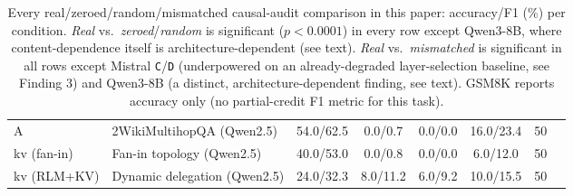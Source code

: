 \begin{table}[t]
\begin{tabular}{llcccccc}
A            & 2WikiMultihopQA (Qwen2.5)   & 54.0/62.5 & 0.0/0.7  & 0.0/0.0  & 16.0/23.4 & 50 \\
kv (fan-in)  & Fan-in topology (Qwen2.5)   & 40.0/53.0 & 0.0/0.8  & 0.0/0.0  & 6.0/12.0  & 50 \\
kv (RLM+KV)  & Dynamic delegation (Qwen2.5)& 24.0/32.3 & 8.0/11.2 & 6.0/9.2  & 10.0/15.5 & 50 \\
\bottomrule
\end{tabular}
\caption{Every real/zeroed/random/mismatched causal-audit comparison in this
paper: accuracy/F1 (\%) per condition. \emph{Real} vs.\ \emph{zeroed}/\emph{random}
is significant ($p<0.0001$) in every row except Qwen3-8B, where content-dependence
itself is architecture-dependent (see text). \emph{Real} vs.\ \emph{mismatched}
is significant in all rows except Mistral \texttt{C}/\texttt{D} (underpowered on
an already-degraded layer-selection baseline, see Finding 3) and Qwen3-8B (a
distinct, architecture-dependent finding, see text). GSM8K reports accuracy only
(no partial-credit F1 metric for this task).}
\label{tab:causal_audit_full}
\end{table}
